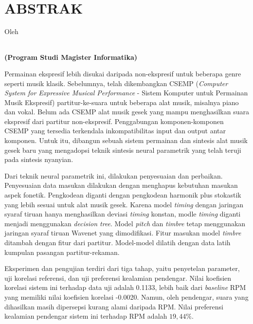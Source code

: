 \clearpage
\chapter*{ABSTRAK}
\begin{center}
	\singlespacing
    \large \bfseries \MakeUppercase{\thetitle}

    \normalsize \normalfont Oleh

    \bfseries \large \theauthor\\
    \normalsize (Program Studi Magister Informatika)
    \bigskip
\end{center}

\begin{singlespace}

Permainan ekspresif lebih disukai daripada non-ekspresif untuk beberapa genre seperti musik klasik. Sebelumnya, telah dikembangkan CSEMP (\textit{Computer System for Expressive Musical Performance} - Sistem Komputer untuk Permainan Musik Ekspresif) partitur-ke-suara untuk beberapa alat musik, misalnya piano dan vokal. Belum ada CSEMP alat musik gesek yang mampu menghasilkan suara ekspresif dari partitur non-ekspresif. Penggabungan komponen-komponen CSEMP yang tersedia terkendala inkompatibilitas input dan output antar komponen. Untuk itu, dibangun sebuah sistem permainan dan sintesis alat musik gesek baru yang mengadopsi teknik sintesis neural parametrik yang telah teruji pada sintesis nyanyian.

Dari teknik neural parametrik ini, dilakukan penyesuaian dan perbaikan. Penyesuaian data masukan dilakukan dengan menghapus kebutuhan masukan aspek fonetik. Pengkodean diganti dengan pengkodean harmonik plus stokastik yang lebih sesuai untuk alat musik gesek. Karena model \textit{timing} dengan jaringan syaraf tiruan hanya menghasilkan deviasi \textit{timing} konstan, modle \textit{timing} diganti menjadi menggunakan \textit{decision tree}. Model \textit{pitch} dan \textit{timbre} tetap menggunakan jaringan syaraf tiruan Wavenet yang dimodifikasi. Fitur masukan model \textit{timbre} ditambah dengan fitur dari partitur. Model-model dilatih dengan data latih kumpulan pasangan partitur-rekaman.

Eksperimen dan pengujian terdiri dari tiga tahap, yaitu penyetelan parameter, uji korelasi referensi, dan uji preferensi kealamian pendengar. Nilai koefisien korelasi sistem ini terhadap data uji adalah 0.1133, lebih baik dari \textit{baseline} RPM yang memiliki nilai koefisien korelasi -0.0020. Namun, oleh pendengar, suara yang dihasilkan masih dipersepsi kurang alami daripada RPM. Nilai preferensi kealamian pendengar sistem ini terhadap RPM adalah $19,44\%$.


\end{singlespace}
\clearpage